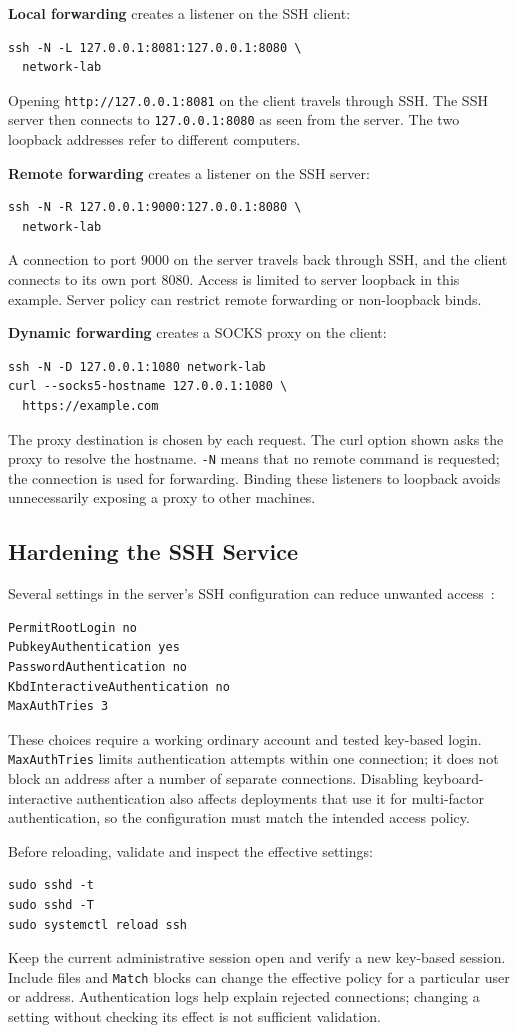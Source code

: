 \documentclass[journal]{IEEEtran}
\begin{document}
\textbf{Local forwarding} creates a listener on the SSH client:
\begin{lstlisting}
ssh -N -L 127.0.0.1:8081:127.0.0.1:8080 \
  network-lab
\end{lstlisting}
Opening \texttt{http://127.0.0.1:8081} on the client travels through SSH. The SSH server then connects to \texttt{127.0.0.1:8080} as seen from the server. The two loopback addresses refer to different computers.

\textbf{Remote forwarding} creates a listener on the SSH server:
\begin{lstlisting}
ssh -N -R 127.0.0.1:9000:127.0.0.1:8080 \
  network-lab
\end{lstlisting}
A connection to port 9000 on the server travels back through SSH, and the client connects to its own port 8080. Access is limited to server loopback in this example. Server policy can restrict remote forwarding or non-loopback binds.

\textbf{Dynamic forwarding} creates a SOCKS proxy on the client:
\begin{lstlisting}
ssh -N -D 127.0.0.1:1080 network-lab
curl --socks5-hostname 127.0.0.1:1080 \
  https://example.com
\end{lstlisting}
The proxy destination is chosen by each request. The curl option shown asks the proxy to resolve the hostname. \texttt{-N} means that no remote command is requested; the connection is used for forwarding. Binding these listeners to loopback avoids unnecessarily exposing a proxy to other machines.

\subsection{Hardening the SSH Service}
Several settings in the server's SSH configuration can reduce unwanted access~\cite{sshd}:
\begin{lstlisting}
PermitRootLogin no
PubkeyAuthentication yes
PasswordAuthentication no
KbdInteractiveAuthentication no
MaxAuthTries 3
\end{lstlisting}
These choices require a working ordinary account and tested key-based login. \texttt{MaxAuthTries} limits authentication attempts within one connection; it does not block an address after a number of separate connections. Disabling keyboard-interactive authentication also affects deployments that use it for multi-factor authentication, so the configuration must match the intended access policy.

Before reloading, validate and inspect the effective settings:
\begin{lstlisting}
sudo sshd -t
sudo sshd -T
sudo systemctl reload ssh
\end{lstlisting}
Keep the current administrative session open and verify a new key-based session. Include files and \texttt{Match} blocks can change the effective policy for a particular user or address. Authentication logs help explain rejected connections; changing a setting without checking its effect is not sufficient validation.
\end{document}

